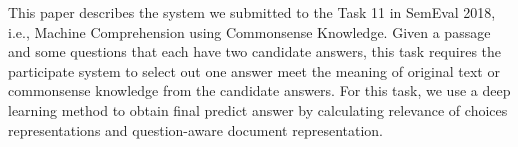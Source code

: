 This paper describes the system we submitted to the Task 11 in SemEval 2018, i.e., Machine Comprehension using Commonsense Knowledge. Given a passage and some questions that each have two candidate answers, this task requires the participate system to select out one answer meet the meaning of original text or commonsense knowledge from the candidate answers. For this task, we use a deep learning method to obtain final predict answer by calculating relevance of choices representations and question-aware document representation.
